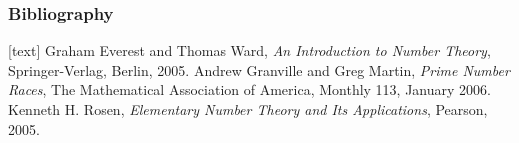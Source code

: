 \documentclass{beamer}
\begin{document}
	\begin{frame}
		\frametitle{Bibliography}
		 \begin{thebibliography}{}
			[text]
			 Graham Everest and Thomas Ward, {\em An Introduction to Number Theory},  Springer-Verlag,
	 		Berlin, 2005.
			  Andrew Granville and Greg Martin, {\em Prime Number Races}, The Mathematical Association of 
			America, Monthly 113, January 2006.
			     Kenneth H. Rosen, {\em Elementary Number Theory and Its Applications}, Pearson, 2005.
		\end{thebibliography}
	\end{frame}
\end{document}

